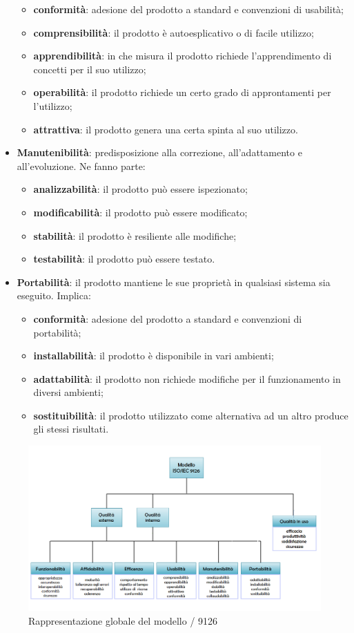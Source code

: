 \begin{itemize}
	\begin{itemize}
		\item \textbf{conformità}: adesione del prodotto a standard e convenzioni di usabilità;
		\item \textbf{comprensibilità}: il prodotto è autoesplicativo o di facile utilizzo;
		\item \textbf{apprendibilità}: in che misura il prodotto richiede l'apprendimento di concetti per il suo utilizzo;
		\item \textbf{operabilità}: il prodotto richiede un certo grado di approntamenti per l'utilizzo;
		\item \textbf{attrattiva}: il prodotto genera una certa spinta al suo utilizzo.
	\end{itemize}	
	\item \textbf{Manutenibilità}: predisposizione alla correzione, all'adattamento e all'evoluzione. Ne fanno parte: 
	\begin{itemize}
		\item \textbf{analizzabilità}: il prodotto può essere ispezionato;
		\item \textbf{modificabilità}: il prodotto può essere modificato;
		\item \textbf{stabilità}: il prodotto è resiliente alle modifiche;
		\item \textbf{testabilità}: il prodotto può essere testato.
	\end{itemize}
	\item \textbf{Portabilità}: il prodotto mantiene le sue proprietà in qualsiasi sistema sia eseguito. Implica:
	\begin{itemize}
		\item \textbf{conformità}: adesione del prodotto a standard e convenzioni di portabilità;
	\item \textbf{installabilità}: il prodotto è disponibile in vari ambienti;
	\item \textbf{adattabilità}: il prodotto non richiede modifiche per il funzionamento in diversi ambienti;
	\item \textbf{sostituibilità}: il prodotto utilizzato come alternativa ad un altro produce gli stessi risultati.
	\end{itemize}
\end{itemize}
\begin{figure}[H]
	\centering
	\includegraphics[width=15cm]{iso9126}
	\caption{Rappresentazione globale del modello / 9126}
\end{figure}